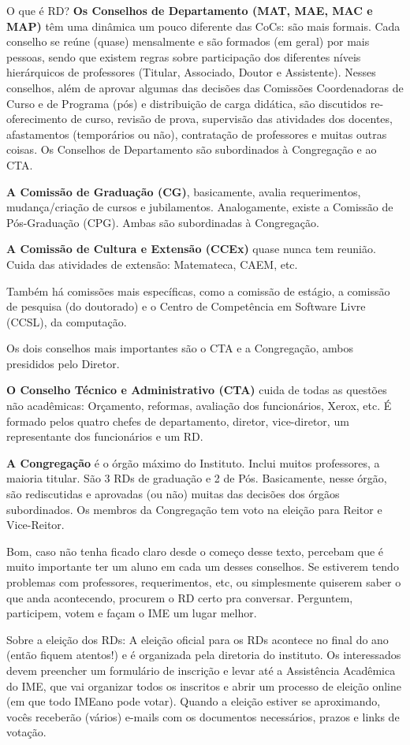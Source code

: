 \begin{secao}{O que é RD?}
{\bf Os Conselhos de Departamento (MAT, MAE, MAC e MAP)} têm uma dinâmica um
pouco diferente das CoCs: são mais formais. Cada conselho se reúne (quase)
mensalmente e são formados (em geral) por mais pessoas, sendo que existem
regras sobre participação dos diferentes níveis hierárquicos de
professores (Titular, Associado, Doutor e Assistente). Nesses conselhos, além
de aprovar algumas das decisões das Comissões Coordenadoras de Curso e de
Programa (pós) e distribuição de carga didática, são discutidos re-oferecimento
de curso, revisão de prova, supervisão das atividades dos docentes,
afastamentos (temporários ou não), contratação de professores e muitas outras
coisas.
Os Conselhos de Departamento são subordinados à Congregação e ao CTA.

{\bf A Comissão de Graduação (CG)}, basicamente, avalia requerimentos,
mudança/criação de cursos e jubilamentos. Analogamente, existe a Comissão de
Pós-Graduação (CPG). Ambas são subordinadas à Congregação.

{\bf A Comissão de Cultura e Extensão (CCEx)} quase nunca tem reunião. Cuida
das atividades de extensão: Matemateca, CAEM, etc.

Também há comissões mais específicas, como a comissão de estágio, a comissão de
pesquisa (do doutorado) e o Centro de Competência em Software Livre (CCSL), da
computação.

Os dois conselhos mais importantes são o CTA e a Congregação, ambos presididos
pelo Diretor.

{\bf O Conselho Técnico e Administrativo (CTA)} cuida de todas as questões não
acadêmicas: Orçamento, reformas, avaliação dos funcionários, Xerox, etc. É
formado pelos quatro chefes de departamento, diretor, vice-diretor, um
representante dos funcionários e um RD.

{\bf A Congregação} é o órgão máximo do Instituto. Inclui muitos professores, a
maioria titular. São 3 RDs de graduação e 2 de Pós. Basicamente,
nesse órgão, são rediscutidas e aprovadas (ou não) muitas das decisões
dos órgãos subordinados. Os membros da Congregação tem voto na eleição para
Reitor e Vice-Reitor.

Bom, caso não tenha ficado claro desde o começo desse texto, percebam que é
muito importante ter um aluno em cada um desses conselhos. Se estiverem tendo
problemas com professores, requerimentos, etc, ou simplesmente quiserem saber
o que anda acontecendo, procurem o RD certo pra conversar. Perguntem,
participem, votem e façam o IME um lugar melhor.

Sobre a eleição dos RDs: A eleição oficial para os RDs acontece no final do ano
(então fiquem atentos!) e é organizada pela diretoria do instituto. Os
interessados devem preencher um formulário de inscrição e levar até a
Assistência Acadêmica do IME, que vai organizar todos os inscritos e abrir um
processo de eleição online (em que todo IMEano pode votar). Quando a eleição
estiver se aproximando, vocês receberão (vários) e-mails com os documentos
necessários, prazos e links de votação.

\end{secao}

